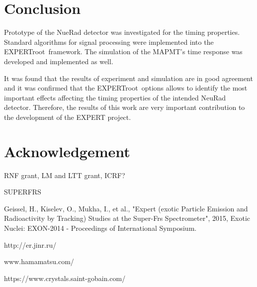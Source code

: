 \documentclass{webofc}
\newcommand{\er}{\textmd{EXPERTroot}}
\begin{document}
\section{Conclusion}
	
	Prototype of the NueRad detector was investigated for the timing properties.
	Standard algorithms for signal processing were implemented into the \er\ framework. The simulation of the MAPMT's time response was developed and implemented as well.
	
	
	It was found that the results of experiment and simulation are in good agreement and it was confirmed that the \er\ options allows to identify the most important effects affecting the timing properties of the intended NeuRad detector.
	Therefore, the results of this work are very important contribution to the development of the EXPERT project.

\section{Acknowledgement}	
	RNF grant, LM and LTT grant, ICRF?

\begin{thebibliography}{99}
	
	 SUPERFRS
	
	Geissel, H., Kiselev, O., Mukha, I., et al., "Expert (exotic Particle Emission and Radioactivity by Tracking) Studies at the Super-Frs Spectrometer", 2015, Exotic Nuclei: EXON-2014 - Proceedings of International Symposium.
	
	http://er.jinr.ru/
	
	www.hamamatsu.com/
	
	https://www.crystals.saint-gobain.com/
	
\end{thebibliography}
\end{document}
